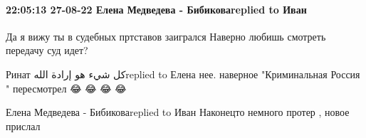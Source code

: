  
 
 
 
 

\paragraph{22:05:13 27-08-22 Елена Медведева - Бибиковаreplied to Иван}
Да я вижу ты в судебных пртставов заигрался Наверно любишь смотреть передачу суд идет?

Ринат كل شيء هو إرادة اللهreplied to Елена
нее. наверное "Криминальная Россия " пересмотрел 😂 😂 😂 😂

Елена Медведева - Бибиковаreplied to Иван
Наконецто немного протер , новое прислал
